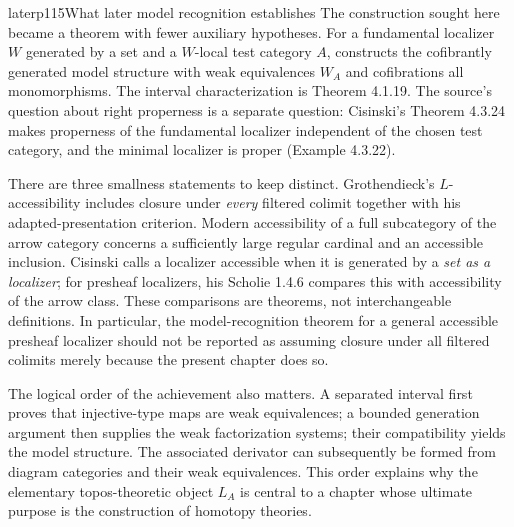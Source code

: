 \begin{dcomment}{later}{p115}{What later model recognition establishes}
The construction sought here became a theorem with fewer auxiliary hypotheses. For a fundamental localizer $W$ generated by a set and a $W$-local test category $A$, \citet[Corollary 4.2.18]{Cisinski2006} constructs the cofibrantly generated model structure with weak equivalences $W_A$ and cofibrations all monomorphisms. The interval characterization is Theorem 4.1.19. The source's question about right properness is a separate question: Cisinski's Theorem 4.3.24 makes properness of the fundamental localizer independent of the chosen test category, and the minimal localizer is proper (Example 4.3.22).

There are three smallness statements to keep distinct. Grothendieck's $L$-accessibility includes closure under \emph{every} filtered colimit together with his adapted-presentation criterion. Modern accessibility of a full subcategory of the arrow category concerns a sufficiently large regular cardinal and an accessible inclusion. Cisinski calls a localizer accessible when it is generated by a \emph{set as a localizer}; for presheaf localizers, his Scholie 1.4.6 compares this with accessibility of the arrow class. These comparisons are theorems, not interchangeable definitions. In particular, the model-recognition theorem for a general accessible presheaf localizer should not be reported as assuming closure under all filtered colimits merely because the present chapter does so.

The logical order of the achievement also matters. A separated interval first proves that injective-type maps are weak equivalences; a bounded generation argument then supplies the weak factorization systems; their compatibility yields the model structure. The associated derivator can subsequently be formed from diagram categories and their weak equivalences. This order explains why the elementary topos-theoretic object $L_A$ is central to a chapter whose ultimate purpose is the construction of homotopy theories.
\end{dcomment}


